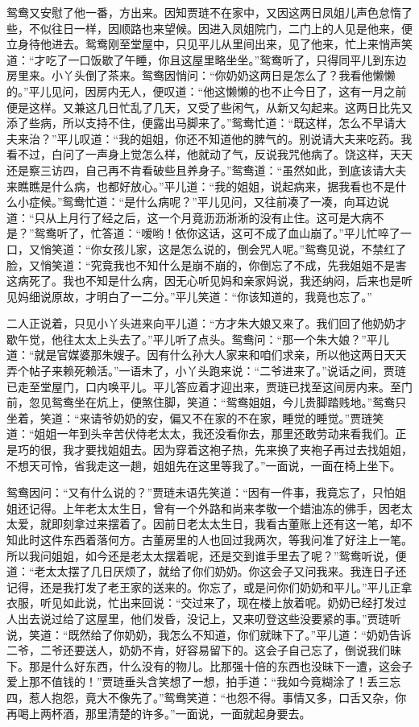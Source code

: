 鸳鸯又安慰了他一番，方出来。因知贾琏不在家中，又因这两日凤姐儿声色怠惰了些，不似往日一样，因顺路也来望候。因进入凤姐院门，二门上的人见是他来，便立身待他进去。鸳鸯刚至堂屋中，只见平儿从里间出来，见了他来，忙上来悄声笑道：``才吃了一口饭歇了午睡，你且这屋里略坐坐。''鸳鸯听了，只得同平儿到东边房里来。小丫头倒了茶来。鸳鸯因悄问：``你奶奶这两日是怎么了？我看他懒懒的。''平儿见问，因房内无人，便叹道：``他这懒懒的也不止今日了，这有一月之前便是这样。又兼这几日忙乱了几天，又受了些闲气，从新又勾起来。这两日比先又添了些病，所以支持不住，便露出马脚来了。''鸳鸯忙道：``既这样，怎么不早请大夫来治？''平儿叹道：``我的姐姐，你还不知道他的脾气的。别说请大夫来吃药。我看不过，白问了一声身上觉怎么样，他就动了气，反说我咒他病了。饶这样，天天还是察三访四，自己再不肯看破些且养身子。''鸳鸯道：``虽然如此，到底该请大夫来瞧瞧是什么病，也都好放心。''平儿道：``我的姐姐，说起病来，据我看也不是什么小症候。''鸳鸯忙道：``是什么病呢？''平儿见问，又往前凑了一凑，向耳边说道：``只从上月行了经之后，这一个月竟沥沥淅淅的没有止住。这可是大病不是？''鸳鸯听了，忙答道：``嗳哟！依你这话，这可不成了血山崩了。''平儿忙啐了一口，又悄笑道：``你女孩儿家，这是怎么说的，倒会咒人呢。''鸳鸯见说，不禁红了脸，又悄笑道：``究竟我也不知什么是崩不崩的，你倒忘了不成，先我姐姐不是害这病死了。我也不知是什么病，因无心听见妈和亲家妈说，我还纳闷，后来也是听见妈细说原故，才明白了一二分。''平儿笑道：``你该知道的，我竟也忘了。''

二人正说着，只见小丫头进来向平儿道：``方才朱大娘又来了。我们回了他奶奶才歇午觉，他往太太上头去了。''平儿听了点头。鸳鸯问：``那一个朱大娘？''平儿道：``就是官媒婆那朱嫂子。因有什么孙大人家来和咱们求亲，所以他这两日天天弄个帖子来赖死赖活。''一语未了，小丫头跑来说：``二爷进来了。''说话之间，贾琏已走至堂屋门，口内唤平儿。平儿答应着才迎出来，贾琏已找至这间房内来。至门前，忽见鸳鸯坐在炕上，便煞住脚，笑道：``鸳鸯姐姐，今儿贵脚踏贱地。''鸳鸯只坐着，笑道：``来请爷奶奶的安，偏又不在家的不在家，睡觉的睡觉。''贾琏笑道：``姐姐一年到头辛苦伏侍老太太，我还没看你去，那里还敢劳动来看我们。正是巧的很，我才要找姐姐去。因为穿着这袍子热，先来换了夹袍子再过去找姐姐，不想天可怜，省我走这一趟，姐姐先在这里等我了。''一面说，一面在椅上坐下。

鸳鸯因问：``又有什么说的？''贾琏未语先笑道：``因有一件事，我竟忘了，只怕姐姐还记得。上年老太太生日，曾有一个外路和尚来孝敬一个蜡油冻的佛手，因老太太爱，就即刻拿过来摆着了。因前日老太太生日，我看古董账上还有这一笔，却不知此时这件东西着落何方。古董房里的人也回过我两次，等我问准了好注上一笔。所以我问姐姐，如今还是老太太摆着呢，还是交到谁手里去了呢？''鸳鸯听说，便道：``老太太摆了几日厌烦了，就给了你们奶奶。你这会子又问我来。我连日子还记得，还是我打发了老王家的送来的。你忘了，或是问你们奶奶和平儿。''平儿正拿衣服，听见如此说，忙出来回说：``交过来了，现在楼上放着呢。奶奶已经打发过人出去说过给了这屋里，他们发昏，没记上，又来叨登这些没要紧的事。''贾琏听说，笑道：``既然给了你奶奶，我怎么不知道，你们就昧下了。''平儿道：``奶奶告诉二爷，二爷还要送人，奶奶不肯，好容易留下的。这会子自己忘了，倒说我们昧下。那是什么好东西，什么没有的物儿。比那强十倍的东西也没昧下一遭，这会子爱上那不值钱的！''贾琏垂头含笑想了一想，拍手道：``我如今竟糊涂了！丢三忘四，惹人抱怨，竟大不像先了。''鸳鸯笑道：``也怨不得。事情又多，口舌又杂，你再喝上两杯酒，那里清楚的许多。''一面说，一面就起身要去。


